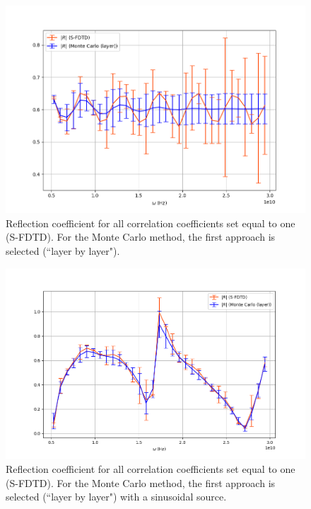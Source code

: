 \documentclass[12pt, oneside]{book}
\begin{document}
\begin{figure}
\centering
\includegraphics[scale=0.5]{Rsfdtdmcgausslayercorr1(6).png}
\caption{Reflection coefficient for all correlation coefficients set equal to one (S-FDTD). For the Monte Carlo method, the first approach is selected (``layer by layer").}\label{stdR(6)}
\end{figure}

\begin{figure}
\centering
\includegraphics[scale=0.5]{Rsfdtdmcsinlayer(10).png}
\caption{Reflection coefficient for all correlation coefficients set equal to one (S-FDTD). For the Monte Carlo method, the first approach is selected (``layer by layer") with a sinusoidal source.}\label{stdR(10)}
\end{figure}
\end{document}
